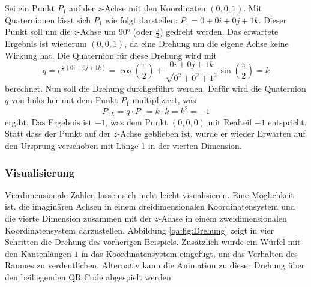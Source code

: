 \begin{beispiel}
    Sei ein Punkt $P_1$ auf der $z$-Achse mit den Koordinaten $(0,0,1)
    $. Mit Quaternionen lässt sich $P_1$ wie folgt darstellen: $P_1 = 0
    + 0i + 0j + 1k$. Dieser Punkt soll um die $z$-Achse um 90° (oder 
    $\frac{\pi}{2}$) gedreht werden. Das erwartete Ergebnis ist 
    wiederum $(0,0,1)$, da eine Drehung um die eigene Achse keine 
    Wirkung hat. Die Quaternion für diese Drehung wird mit 
    \begin{equation*}
        q = e^{\frac{\pi}{2}(0i + 0j + 1k)} 
        = \cos\left(\frac{\pi}{2}\right) 
        + \frac{0i + 0j + 1k}{\sqrt{0^2 + 0^2 + 1^2}}
        \sin\left(\frac{\pi}{2}\right) 
        = k
    \end{equation*}
    berechnet. Nun soll die Drehung durchgeführt werden. Dafür wird die 
    Quaternion $q$ von links her mit dem Punkt $P_1$ multipliziert, was
    \begin{equation*}
        P_{1L} = q \cdot P_1 = k \cdot k = k^2 = -1
    \end{equation*}
    ergibt.
    Das Ergebnis ist $-1$, was dem Punkt $(0,0,0)$ mit Realteil $-1$ entspricht. 
    Statt dass der Punkt auf der $z$-Achse geblieben ist, wurde er wieder Erwarten 
    auf den Ursprung verschoben mit Länge 1 in der vierten Dimension.
\end{beispiel}

\subsubsection{Visualisierung}

Vierdimensionale Zahlen lassen sich nicht leicht visualisieren. 
Eine Möglichkeit ist, die imaginären Achsen in einem 
dreidimensionalen Koordinatensystem und die vierte Dimension 
zusammen mit der $z$-Achse in einem zweidimensionalen 
Koordinatensystem darzustellen. Abbildung \ref{qa:fig:Drehung} zeigt in vier 
Schritten die Drehung des vorherigen Beispiels. Zusätzlich wurde ein Würfel mit 
den Kantenlängen $1$ in das Koordinatensystem eingefügt, um das Verhalten des Raumes 
zu verdeutlichen.
Alternativ kann die Animation zu dieser Drehung über den beiliegenden QR Code abgespielt werden.

